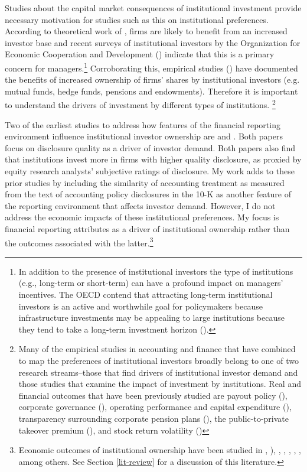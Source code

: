 \documentclass[thesis]{thesis-umich}
\begin{document}
Studies about the capital market consequences of institutional investment provide necessary motivation for studies such as this on institutional preferences. According to theoretical work of \cite{merton1987}, firms are likely to benefit from an increased investor base and recent surveys of institutional investors by the Organization for Economic Cooperation and Development (\cite{oecd2014}) indicate that this is a primary concern for managers.\footnote{In addition to the presence of institutional investors the type of institutions (e.g., long-term or short-term) can have a profound impact on managers' incentives. The OECD contend that attracting long-term institutional investors is an active and worthwhile goal for policymakers because infrastructure investments may be appealing to large institutions because they tend to take a long-term investment horizon (\cite{oecd2014}).} Corroborating this, empirical studies (\cite{lehavysloan2008}) have documented the benefits of increased ownership of firms' shares by institutional investors (e.g. mutual funds, hedge funds, pensions and endowments). Therefore it is important to understand the drivers of investment by different types of institutions. \footnote{Many of the empirical studies in accounting and finance that have combined to map the preferences of institutional investors broadly belong to one of two research streams--those that find drivers of institutional investor demand and those studies that examine the impact of investment by institutions. Real and financial outcomes that have been previously studied are payout policy (\cite{grinsteinmichaely2005}), corporate governance (\cite{chungzhang2011}), operating performance and capital expenditure (\cite{ferreiramatos2008}), transparency surrounding corporate pension plans (\cite{eatonetal2014}), the public-to-private takeover premium (\cite{bajo2013}), and stock return volatility (\cite{busheenoe2000})}

Two of the earliest studies to address how features of the financial reporting environment influence institutional investor ownership are \cite{healyetal1999} and \cite{busheenoe2000}. Both papers focus on disclosure quality as a driver of investor demand. Both papers also find that institutions invest more in firms with higher quality disclosure, as proxied by equity research analysts' subjective ratings of disclosure. My work adds to these prior studies by including the similarity of accounting treatment as measured from the text of accounting policy disclosures in the 10-K as another feature of the reporting environment that affects investor demand. However, I do not address the economic impacts of these institutional preferences. My focus is financial reporting attributes as a driver of institutional ownership rather than the outcomes associated with the latter.\footnote{Economic outcomes of institutional ownership have been studied in \cite{lehavysloan2008}, \cite{grinsteinmichaely2005}), \cite{chungzhang2011}, \cite{ferreiramatos2008}, \cite{eatonetal2014}, \cite{bajo2013}, \cite{busheenoe2000}, among others. See Section \ref{lit-review} for a discussion of this literature. }
\end{document}
